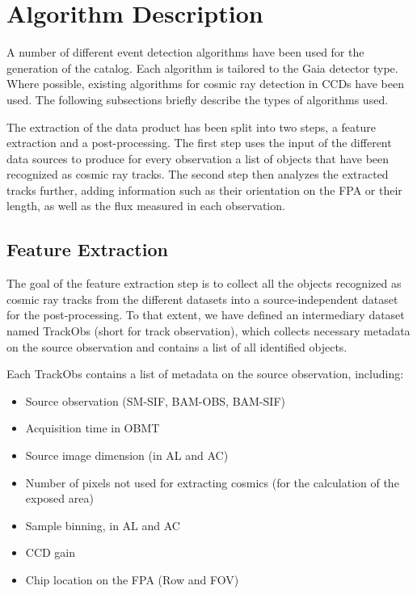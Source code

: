 \documentclass[a4paper, 11pt]{article}
\begin{document}
\section{Algorithm Description}

A number of different event detection algorithms have been used for the generation of the catalog. Each algorithm is tailored to the Gaia detector type. Where possible, existing algorithms for cosmic ray detection in CCDs have been used. The following subsections briefly describe the types of algorithms used.

The extraction of the data product has been split into two steps, a feature extraction and a post-processing. The first step uses the input of the different data sources to produce for every observation a list of objects that have been recognized as cosmic ray tracks. The second step then analyzes the extracted tracks further, adding information such as their orientation on the FPA or their length, as well as the flux measured in each observation.

\subsection{Feature Extraction}
\label{sec:extraction}

The goal of the feature extraction step is to collect all the objects recognized as cosmic ray tracks from the different datasets into a source-independent dataset for the post-processing. To that extent, we have defined an intermediary dataset named TrackObs (short for track observation), which collects necessary metadata on the source observation and contains a list of all identified objects.

Each TrackObs contains a list of metadata on the source observation, including:
\begin{itemize}
  \item Source observation (SM-SIF, BAM-OBS, BAM-SIF)
  \item Acquisition time in OBMT
  \item Source image dimension (in AL and AC)
  \item Number of pixels not used for extracting cosmics (for the calculation of the exposed area)
  \item Sample binning, in AL and AC
  \item CCD gain
  \item Chip location on the FPA (Row and FOV)
\end{itemize}
\end{document}
